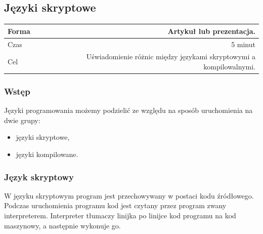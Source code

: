 \documentclass{mwart}
\begin{document}
\subsection{Języki skryptowe}
\begin{center}
  \begin{tabular}{lr}
    \toprule
    Forma & Artykuł lub prezentacja. \\
    \midrule
    Czas & 5 minut \\
    Cel & Uświadomienie różnic między językami skryptowymi a kompilowalnymi. \\
    \bottomrule
  \end{tabular}
\end{center}

\subsubsection{Wstęp}
Języki programowania możemy podzielić ze względu na sposób uruchomienia na dwie grupy:

\begin{itemize}
  \item języki skryptowe,
  \item języki kompilowane.
\end{itemize}

\subsubsection{Język skryptowy}
W języku skryptowym program jest przechowywany w postaci kodu źródłowego. Podczas
uruchomienia programu kod jest czytany przez program zwany interpreterem. Interpreter
tłumaczy linijka po linijce kod programu na kod maszynowy, a następnie wykonuje go.
\end{document}
